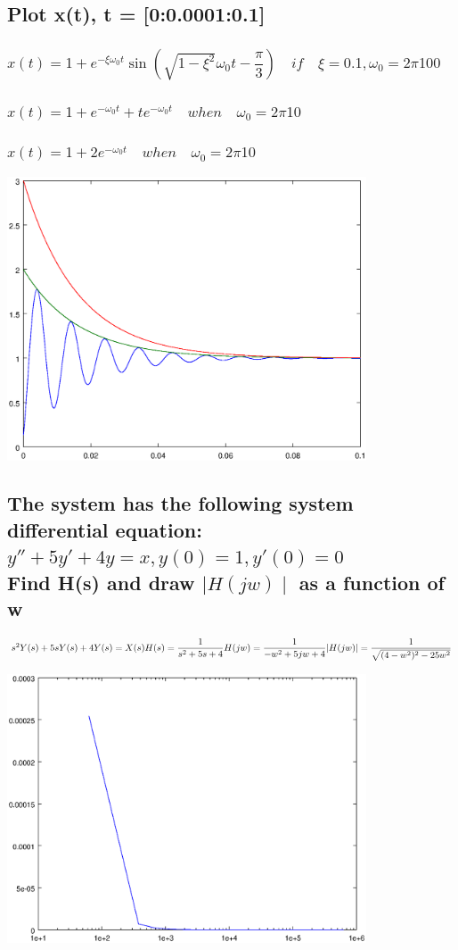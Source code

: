 \documentclass[12pt,a4paper]{article}
\begin{document}
\subsection{Plot x(t), t = [0:0.0001:0.1]}
\subsubsection{$x(t)=1+e^{-\xi\omega_0 t} \sin{(\sqrt{1-\xi^2}\omega_0 t-\dfrac{\pi}{3})}\quad if\quad \xi=0.1, \omega_0=2\pi 100$}
\subsubsection{$x(t)=1+e^{-\omega_0 t}+te^{-\omega_0 t} \quad when \quad \omega_0=2\pi 10$}
\subsubsection{$x(t)=1+2e^{-\omega_0 t} \quad when \quad \omega_0=2\pi 10$}

\includegraphics[width=0.8\textwidth]{a.eps}

\subsection{The system has the following system differential equation:\\
$y''+5y'+4y=x, y(0)=1, y'(0)=0$\\
Find H(s) and draw $\mid H(jw)\mid$ as a function of w}

$s^2Y(s) + 5sY(s) + 4Y(s) = X(s)\\
H(s) = \dfrac{1}{s^2+5s+4}\\
H(jw) = \dfrac{1}{-w^2+5jw+4}\\
|H(jw)|=\dfrac{1}{\sqrt{(4-w^2)^2-25w^2}}$
\vspace{1cm}

\includegraphics[width=0.8\textwidth]{2.eps}
\end{document}
